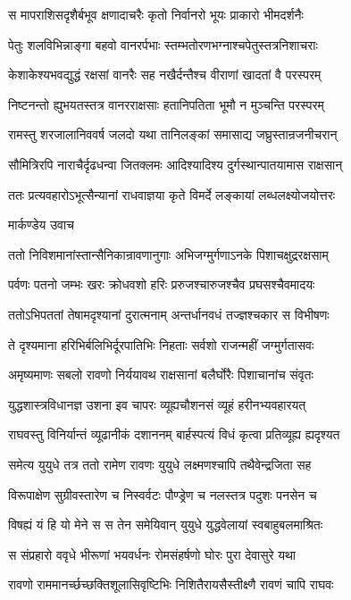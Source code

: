 \twolineshloka
{स मापराशिसदृशैर्बभूव क्षणादाचरैः}
{कृतो निर्वानरो भूयः प्राकारो भीमदर्शनैः}


\twolineshloka
{पेतुः शलविभिन्नाङ्गा बहवो वानरर्पभाः}
{स्तम्भतोरणभग्नाश्चपेतुस्तत्रनिशाचराः}


\twolineshloka
{केशाकेश्यभवद्युद्धं रक्षसां वानरैः सह}
{नखैर्दन्तैश्च वीराणां खादतां वै परस्परम्}


\twolineshloka
{निष्टनन्तो ह्युभयतस्तत्र वानरराक्षसाः}
{हतानिपतिता भूमौ न मुञ्चन्ति परस्परम्}


\twolineshloka
{रामस्तु शरजालानिववर्ष जलदो यथा}
{तानिलङ्कां समासाद्य जघ्रुस्तान्रजनीचरान्}


\twolineshloka
{सौमित्रिरपि नाराचैर्दृढधन्वा जितक्लमः}
{आदिश्यादिश्य दुर्गस्थान्पातयामास राक्षसान्}


\twolineshloka
{ततः प्रत्यवहारोऽभूत्सैन्यानां राधवाज्ञया}
{कृते विमर्दे लङ्कायां लब्धलक्ष्योजयोत्तरः}


\twolineshloka
{मार्कण्डेय उवाच}
{}


\twolineshloka
{ततो निविशमानांस्तान्सैनिकान्रावणानुगाः}
{अभिजग्मुर्गणाऽनके पिशाचक्षुद्ररक्षसाम्}


\twolineshloka
{पर्वणः पतनो जम्भः खरः क्रोधवशो हरिः}
{प्ररुजश्चारुजश्चैव प्रघसश्चैवमादयः}


\twolineshloka
{ततोऽभिपततां तेषामदृश्यानां दुरात्मनाम्}
{अन्तर्धानवधं तज्ज्ञश्चकार स विभीषणः}


\twolineshloka
{ते दृश्यमाना हरिभिर्बलिभिर्दूरपातिभिः}
{निहताः सर्वशो राजन्महीं जग्मुर्गतासवः}


\twolineshloka
{अमृष्यमाणः सबलो रावणो निर्ययावथ}
{राक्षसानां बलैर्घोरैः पिशाचानांच संवृतः}


\twolineshloka
{युद्धशास्त्रविधानज्ञ उशना इव चापरः}
{व्यूह्यचौशनसं व्यूहं हरीनभ्यवहारयत्}


\twolineshloka
{राघवस्तु विनिर्यान्तं व्यूढानीकं दशाननम्}
{बार्हस्पत्यं विधं कृत्वा प्रतिव्यूह्य ह्यदृश्यत}


\twolineshloka
{समेत्य युयुधे तत्र ततो रामेण रावणः}
{युयुधे लक्ष्मणश्चापि तथैवेन्द्रजिता सह}


\twolineshloka
{विरूपाक्षेण सुग्रीवस्तारेण च निस्वर्वटः}
{पौण्ड्रेण च नलस्तत्र पदुशः पनसेन च}


\twolineshloka
{विषह्यं यं हि यो मेने स स तेन समेयिवान्}
{युयुधे युद्धवेलायां स्वबाहुबलमाश्रितः}


\twolineshloka
{स संप्रहारो ववृधे भीरूणां भयवर्धनः}
{रोमसंहर्षणो घोरः पुरा देवासुरे यथा}


\twolineshloka
{रावणो राममानर्च्छच्छक्तिशूलासिवृष्टिभिः}
{निशितैरायसैस्तीक्ष्णै रावणं चापि राघवः}


